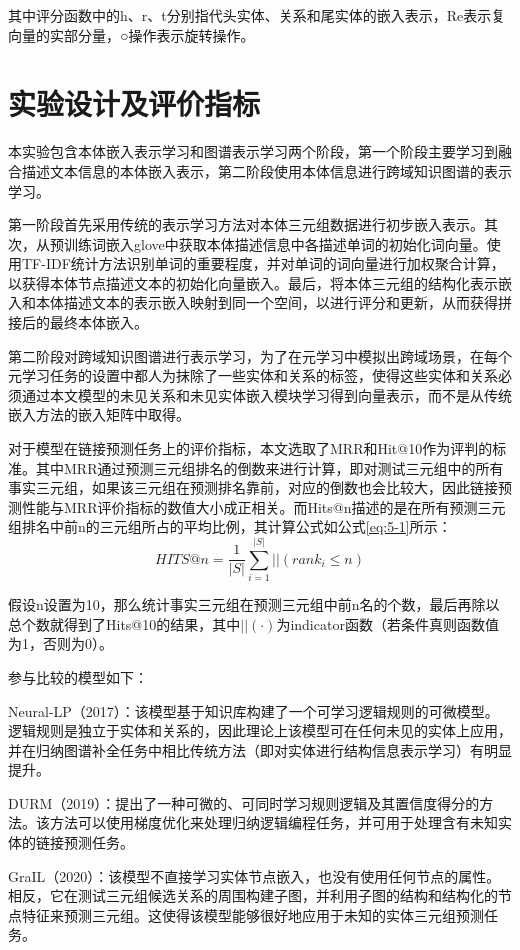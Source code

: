 其中评分函数中的h、r、t分别指代头实体、关系和尾实体的嵌入表示，Re表示复向量的实部分量，○操作表示旋转操作。

\section{实验设计及评价指标}
本实验包含本体嵌入表示学习和图谱表示学习两个阶段，第一个阶段主要学习到融合描述文本信息的本体嵌入表示，第二阶段使用本体信息进行跨域知识图谱的表示学习。

第一阶段首先采用传统的表示学习方法对本体三元组数据进行初步嵌入表示。其次，从预训练词嵌入glove中获取本体描述信息中各描述单词的初始化词向量。使用TF-IDF统计方法识别单词的重要程度，并对单词的词向量进行加权聚合计算，以获得本体节点描述文本的初始化向量嵌入。最后，将本体三元组的结构化表示嵌入和本体描述文本的表示嵌入映射到同一个空间，以进行评分和更新，从而获得拼接后的最终本体嵌入。

第二阶段对跨域知识图谱进行表示学习，为了在元学习中模拟出跨域场景，在每个元学习任务的设置中都人为抹除了一些实体和关系的标签，使得这些实体和关系必须通过本文模型的未见关系和未见实体嵌入模块学习得到向量表示，而不是从传统嵌入方法的嵌入矩阵中取得。

对于模型在链接预测任务上的评价指标，本文选取了MRR和Hit@10作为评判的标准。其中MRR通过预测三元组排名的倒数来进行计算，即对测试三元组中的所有事实三元组，如果该三元组在预测排名靠前，对应的倒数也会比较大，因此链接预测性能与MRR评价指标的数值大小成正相关。而Hits@n描述的是在所有预测三元组排名中前n的三元组所占的平均比例，其计算公式如公式\ref{eq:5-1}所示：
\begin{equation}
  HITS@n = \frac{1}{|S|} \sum_{i=1}^{|S|}||(rank_{i} \leqslant n) \label{eq:5-1}
\end{equation}

假设n设置为10，那么统计事实三元组在预测三元组中前n名的个数，最后再除以总个数就得到了Hits@10的结果，其中\(||(·)\)为indicator函数（若条件真则函数值为1，否则为0）。

参与比较的模型如下：

Neural-LP\cite{yang2017differentiable}（2017）：该模型基于知识库构建了一个可学习逻辑规则的可微模型。逻辑规则是独立于实体和关系的，因此理论上该模型可在任何未见的实体上应用，并在归纳图谱补全任务中相比传统方法（即对实体进行结构信息表示学习）有明显提升。

DURM\cite{sadeghian2019drum}（2019）：提出了一种可微的、可同时学习规则逻辑及其置信度得分的方法。该方法可以使用梯度优化来处理归纳逻辑编程任务，并可用于处理含有未知实体的链接预测任务。

GraIL\cite{teru2020inductive}（2020）：该模型不直接学习实体节点嵌入，也没有使用任何节点的属性。相反，它在测试三元组候选关系的周围构建子图，并利用子图的结构和结构化的节点特征来预测三元组。这使得该模型能够很好地应用于未知的实体三元组预测任务。

